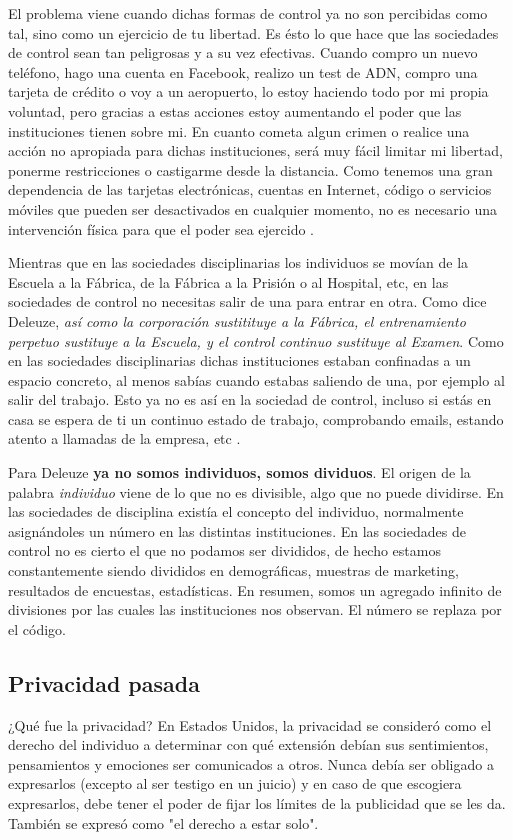 \documentclass[11pt]{article}
\begin{document}
El problema viene cuando dichas formas de control ya no son percibidas como tal, sino como un ejercicio de tu libertad. Es ésto lo que hace que las sociedades de control sean tan peligrosas y a su vez efectivas. Cuando compro un nuevo teléfono, hago una cuenta en Facebook, realizo un test de ADN, compro una tarjeta de crédito o voy a un aeropuerto, lo estoy haciendo todo por mi propia voluntad, pero gracias a estas acciones estoy aumentando el poder que las instituciones tienen sobre mi. En cuanto cometa algun crimen o realice una acción no apropiada para dichas instituciones, será muy fácil limitar mi libertad, ponerme restricciones o castigarme desde la distancia. Como tenemos una gran dependencia de las tarjetas electrónicas, cuentas en Internet, código o servicios móviles que pueden ser desactivados en cualquier momento, no es necesario una intervención física para que el poder sea ejercido \cite{cp-societies}.

Mientras que en las sociedades disciplinarias los individuos se movían de la Escuela a la Fábrica, de la Fábrica a la Prisión o al Hospital, etc, en las sociedades de control no necesitas salir de una para entrar en otra. Como dice Deleuze, \textit{así como la corporación sustitituye a la Fábrica, el entrenamiento perpetuo sustituye a la Escuela, y el control continuo sustituye al Examen}. Como en las sociedades disciplinarias dichas instituciones estaban confinadas a un espacio concreto, al menos sabías cuando estabas saliendo de una, por ejemplo al salir del trabajo. Esto ya no es así en la sociedad de control, incluso si estás en casa se espera de ti un continuo estado de trabajo, comprobando emails, estando atento a llamadas de la empresa, etc \cite{cp-societies}.

Para Deleuze \textbf{ya no somos individuos, somos dividuos}. El origen de la palabra \textit{individuo} viene de lo que no es divisible, algo que no puede dividirse. En las sociedades de disciplina existía el concepto del individuo, normalmente asignándoles un número en las distintas instituciones. En las sociedades de control no es cierto el que no podamos ser divididos, de hecho estamos constantemente siendo divididos en demográficas, muestras de marketing, resultados de encuestas, estadísticas. En resumen, somos un agregado infinito de divisiones por las cuales las instituciones nos observan. El número se replaza por el código.
\subsection{Privacidad pasada}
¿Qué fue la privacidad? En Estados Unidos, la privacidad se consideró como el derecho del individuo a determinar con qué extensión debían sus sentimientos, pensamientos y emociones ser comunicados a otros. Nunca debía ser obligado a expresarlos (excepto al ser testigo en un juicio) y en caso de que escogiera expresarlos, debe tener el poder de fijar los límites de la publicidad que se les da. También se expresó como "el derecho a estar solo".
\end{document}
